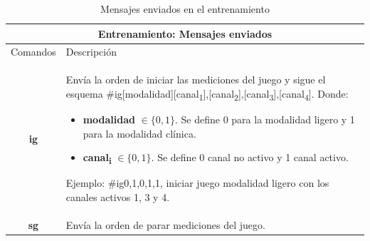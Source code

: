 \begin{table}[h]
    \centering
    \begin{tabular}{ |c|p{14cm}|}
        \hline
        \multicolumn{2}{|c|}{Entrenamiento: Mensajes enviados} \\
        \hline
        Comandos        &   Descripción \\\hline
        \textbf{ig}     &   \begin{minipage}{14cm}
                                \vspace{2pt}

                                Envía la orden de iniciar las mediciones del juego y sigue el esquema \#ig[modalidad][canal\textsubscript{1}],[canal\textsubscript{2}],[canal\textsubscript{3}],[canal\textsubscript{4}]. Donde:
                                
                                \begin{itemize}
                                    \item \textbf{modalidad} $\in \{0, 1\}$. Se define 0 para la modalidad ligero y 1 para la modalidad clínica.
                                    \item \textbf{canal\textsubscript{i}} $\in \{0, 1\}$. Se define 0 canal no activo y  1 canal activo.  
                                \end{itemize}
                                Ejemplo: \#ig0,1,0,1,1, iniciar juego modalidad ligero con los canales activos 1, 3 y 4.
                                \vspace{2pt}   
                            \end{minipage}\\\hline 
        \textbf{sg}     &   Envía la orden de parar mediciones del juego. \\\hline   
                                
    \end{tabular}
    \caption{Mensajes enviados en el entrenamiento}
    \label{table:send-msg-in-game}
\end{table}

